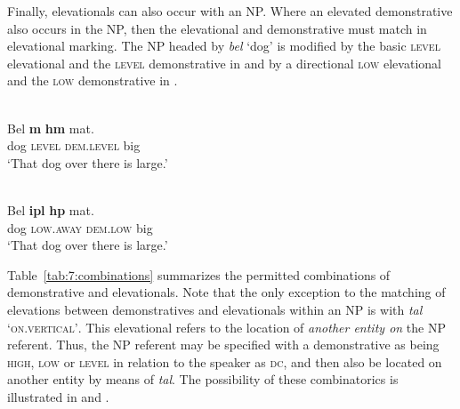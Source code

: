 Finally, elevationals can also occur with an NP. Where an elevated demonstrative also occurs in the NP, then the elevational and demonstrative must match in elevational marking. The NP headed by \textit{bel} `dog' is modified by the basic \textsc{level} elevational and the \textsc{level} demonstrative in  and by a directional \textsc{low} elevational and the \textsc{low} demonstrative in .  



\ea%
\label{ex:7:26}
 \\
\gll Bel  \textbf{m{\textopeno}{\ng}}  \textbf{h{\textepsilon}m{\textopeno}} mat{\textepsilon}.  \\
  dog  \textsc{level} \textsc{dem.level} big      \\
\glt   `That dog over there is large.'
\z

 
 





\ea%
\label{ex:7:27}
 \\
\gll   Bel  \textbf{ipl{\textepsilon}} \textbf{h{\textepsilon}p{\textopeno}} mat{\textepsilon}. \\
    dog  \textsc{low.away} \textsc{dem.low} big    \\
\glt   `That dog over there is large.'
\z



   



Table~\ref{tab:7:combinations} summarizes the permitted combinations of demonstrative and elevationals. Note that the only exception to the matching of elevations between demonstratives and elevationals within an NP is with \textit{tal}\textit{{\textepsilon}} `\textsc{on.vertical'}. This elevational refers to the location of \textit{another entity on} the NP referent. Thus, the NP referent may be specified with a demonstrative as being \textsc{high}, \textsc{low} or \textsc{level} in relation to the speaker as \textsc{dc}, and then also be located on another entity by means of \textit{tal}\textit{{\textepsilon}}. The possibility of these combinatorics is illustrated in  and .

